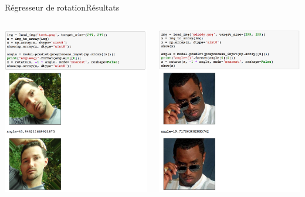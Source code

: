 \documentclass[compress]{beamer}
\begin{document}
\begin{frame}{Régresseur de rotation}{Résultats}
  \begin{columns}
    \begin{column}{0.333\linewidth}\scriptsize
      \includegraphics[width=\linewidth]{resources/rotationreg1}
    \end{column}
    \begin{column}{0.333\linewidth}
      \includegraphics[width=\linewidth]{resources/rotationreg2}

\end{column}
\end{columns}
\end{frame}
\end{document}
